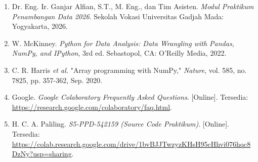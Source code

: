 \documentclass[a4paper,oneside,11pt]{book}
\begin{document}
\begin{enumerate}
    \item \label{modulPraktikum} Dr. Eng. Ir. Ganjar Alfian, S.T., M. Eng., dan Tim Asisten. \textit{Modul Praktikum Penambangan Data 2026}. Sekolah Vokasi Universitas Gadjah Mada: Yogyakarta, 2026.
    
    \item \label{mckinney} W. McKinney. \textit{Python for Data Analysis: Data Wrangling with Pandas, NumPy, and IPython}, 3rd ed. Sebastopol, CA: O'Reilly Media, 2022.
    
    \item \label{harris} C. R. Harris \textit{et al.} "Array programming with NumPy," \textit{Nature}, vol. 585, no. 7825, pp. 357-362, Sep. 2020.
    
    \item \label{colab} Google. \textit{Google Colaboratory Frequently Asked Questions}. [Online]. Tersedia: \url{https://research.google.com/colaboratory/faq.html}.
    
    \item \label{sourceCode} H. C. A. Paliling. \textit{S5-PPD-542159 (Source Code Praktikum)}. [Online]. Tersedia: \url{https://colab.research.google.com/drive/1bvBJJTwzyzKHsH95cHhvi076hqc8DzNy?usp=sharing}.
\end{enumerate}
\end{document}
